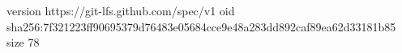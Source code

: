 version https://git-lfs.github.com/spec/v1
oid sha256:7f321223ff90695379d76483e05684cce9e48a283dd892caf89ea62d33181b85
size 78
